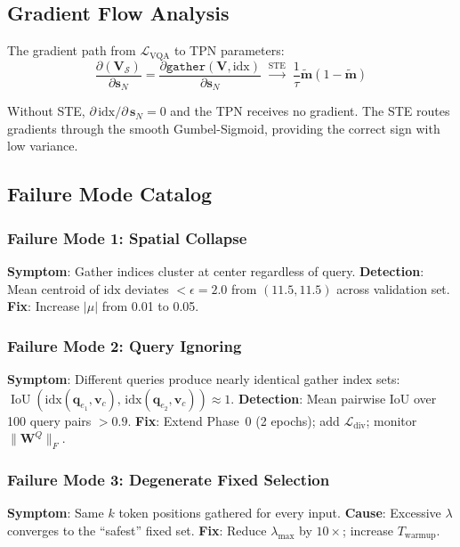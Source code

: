 \documentclass[11pt,a4paper]{article}
\DeclareMathOperator{\IoU}{IoU}
\newcommand{\vc}{\mathbf{v}_c}
\newcommand{\qe}{\mathbf{q}_e}
\newcommand{\vm}{\mathbf{m}}
\newcommand{\vs}{\mathbf{s}}
\newcommand{\mV}{\mathbf{V}}
\begin{document}
\subsection{Gradient Flow Analysis}

The gradient path from $\mathcal{L}_{\text{VQA}}$ to TPN parameters:
\begin{equation}
  \frac{\partial(\mV_\mathcal{S})}{\partial \vs_N}
  = \frac{\partial \texttt{gather}(\mV,\text{idx})}{\partial \vs_N}
  \;\xrightarrow{\text{STE}}\;
  \frac{1}{\tau}\tilde{\vm}(1-\tilde{\vm})
\end{equation}

Without STE, $\partial\,\text{idx}/\partial\,\vs_N = 0$ and the TPN
receives no gradient. The STE routes gradients through the smooth
Gumbel-Sigmoid, providing the correct sign with low variance.

\subsection{Failure Mode Catalog}

\subsubsection{Failure Mode 1: Spatial Collapse}
\begin{warnbox}[title={Spatial Collapse (Center Bias)}]
\textbf{Symptom}: Gather indices cluster at center regardless of query.
\textbf{Detection}: Mean centroid of $\text{idx}$ deviates ${<}\epsilon{=}2.0$
from $(11.5,11.5)$ across validation set.
\textbf{Fix}: Increase $|\mu|$ from 0.01 to 0.05.
\end{warnbox}

\subsubsection{Failure Mode 2: Query Ignoring}
\begin{warnbox}[title={Query Ignoring}]
\textbf{Symptom}: Different queries produce nearly identical gather index
sets: $\IoU(\text{idx}(\qe_1,\vc),\,\text{idx}(\qe_2,\vc)) \approx 1$.
\textbf{Detection}: Mean pairwise IoU over 100 query pairs ${>}0.9$.
\textbf{Fix}: Extend Phase~0 (2 epochs); add $\mathcal{L}_{\text{div}}$;
monitor $\|\mathbf{W}^Q\|_F$.
\end{warnbox}

\subsubsection{Failure Mode 3: Degenerate Fixed Selection}
\begin{warnbox}[title={Degenerate Fixed Selection}]
\textbf{Symptom}: Same $k$ token positions gathered for every input.
\textbf{Cause}: Excessive $\lambda$ converges to the ``safest'' fixed set.
\textbf{Fix}: Reduce $\lambda_{\max}$ by $10\times$; increase $T_{\text{warmup}}$.
\end{warnbox}
\end{document}
